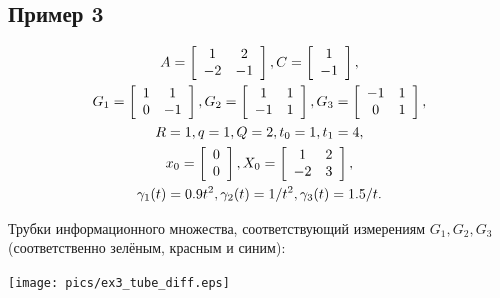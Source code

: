 \documentclass[12pt]{article}
\begin{document}
\subsection{Пример 3}
\begin{gather}
A = \left[ \begin{array}{cc}
1 & 2\\
-2 & -1
\end{array} \right],
C = \left[ \begin{array}{cc}
1 \\
-1
\end{array} \right], \notag \\
G_1 = \left[ \begin{array}{cc}
1 & 1\\
0 & -1
\end{array} \right],
G_2 = \left[ \begin{array}{cc}
1 & 1\\
-1 & 1
\end{array} \right],
G_3 = \left[ \begin{array}{cc}
-1 & 1\\
0 & 1
\end{array} \right], \notag\\
R = 1, q = 1, Q = 2, t_0 = 1, t_1 = 4, \notag\\
x_0 = \left[ \begin{array}{cc}
0\\
0
\end{array} \right],
X_0 = \left[ \begin{array}{cc}
1 & 2\\
-2 & 3
\end{array} \right], \notag \\
\gamma_1(t) = 0.9 t^2, \gamma_2(t) = 1/t^2, \gamma_3(t) = 1.5/t. \notag
\end{gather}

Трубки информационного множества, соответствующий измерениям $G_1, G_2, G_3$ (соответственно зелёным, красным и синим):

\texttt{[image: pics/ex3\_tube\_diff.eps]}
\end{document}
